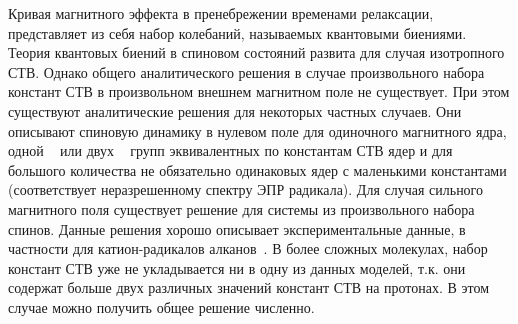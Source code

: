 \documentclass[14pt,titlepage]{extarticle}
\begin{document}
Кривая магнитного эффекта в пренебрежении временами релаксации, представляет из себя набор колебаний, называемых квантовыми биениями. Теория квантовых биений в спиновом состояний развита для случая изотропного СТВ. Однако общего аналитического решения в случае произвольного набора констант СТВ в произвольном внешнем магнитном поле не существует. При этом существуют аналитические решения для некоторых частных случаев. Они описывают спиновую динамику в нулевом поле для одиночного магнитного ядра, одной ~\cite{0036-021X-76-6-R02} или двух ~\cite{bagryansky:224503} групп эквивалентных по константам СТВ ядер и для большого количества не обязательно одинаковых ядер с маленькими константами (соответствует неразрешенному спектру ЭПР радикала). Для случая сильного магнитного поля существует решение для системы из произвольного набора спинов. Данные решения хорошо описывает экспериментальные данные, в частности для катион-радикалов алканов~\cite{springerlink:10.1134/S0012501607080076}. В более сложных молекулах, набор констант СТВ уже не укладывается ни в одну из данных моделей, т.к. они содержат больше двух различных значений констант СТВ на протонах. В этом случае можно получить общее решение численно.
\end{document}
